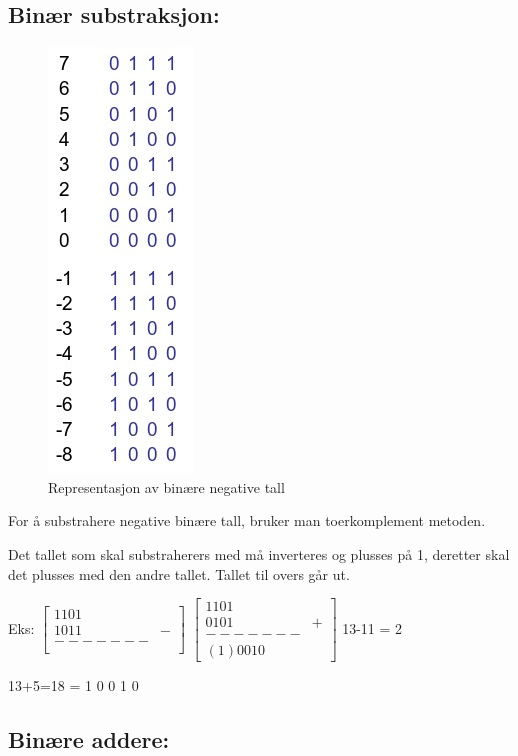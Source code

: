 \documentclass{article}
\begin{document}
	\subsection*{Binær substraksjon:}
	\begin{figure}[H]
		\includegraphics[scale = 0.7]{Nega.jpg}
		\caption{Representasjon av binære negative tall}
	\end{figure}
	
	For å substrahere negative binære tall, bruker man toerkomplement metoden.
	
	Det tallet som skal substraherers med må inverteres og plusses på 1, deretter skal det plusses med den andre tallet. Tallet til overs går ut.
	
	Eks: 
	$\begin{bmatrix}
	1 1 0 1 \\
	1 0 1 1 & -\\
	------- \\
	\end{bmatrix}$ 
	$\begin{bmatrix}
	1 1 0 1 \\
	0 1 0 1 & +\\
	------- \\
	(1) 0 0 1 0
	\end{bmatrix}$
	13-11 = 2
	
	13+5=18 = 1 0 0 1 0
	
	\subsection*{Binære addere:}
\end{document}
